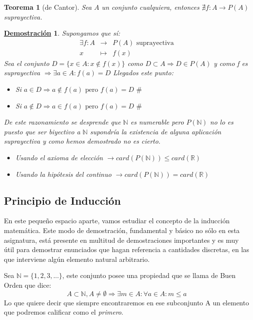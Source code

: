 \documentclass[10pt,a4paper,openright]{book}
\theoremstyle{break}
\newtheorem{theo}{Teorema}[chapter]
\newtheorem*{demo}{\underline{Demostración}}
\begin{document}
\begin{theo}[de Cantor]
Sea $A$ un conjunto cualquiera, entonces $\nexists f: A \rightarrow P(A)$  suprayectiva.
\end{theo}
\begin{demo}
Supongamos que sí:
\begin{eqnarray*}
\exists f: A &\rightarrow & P(A)\mbox{ suprayectiva} \\
x & \longmapsto & f(x)
\end{eqnarray*}
Sea el conjunto $D=\{ x\in A: x\notin f(x)\}$ como $D\subset A\Rightarrow D\in P(A)$ y como f es suprayectiva $\Rightarrow \exists a \in A : f(a)=D$
Llegados este punto:
\begin{itemize}
\item Si $a\in D\Rightarrow a\notin f(a)\mbox{ pero }f(a)=D \mbox{ \#}$
\item Si $a\notin D\Rightarrow a\in f(a)\mbox{ pero }f(a)=D \mbox{ \#}$
\end{itemize}

De este razonamiento se desprende que $\mathbb N$ es numerable pero $P(\mathbb N )$ no lo es puesto que ser biyectivo a $\mathbb N$ supondría la existencia de alguna aplicación suprayectiva y como hemos demostrado no es cierto.
\begin{itemize}
\item Usando el axioma de elección $\rightarrow card(P(\mathbb N))\leq card (\mathbb R)$
\item Usando la hipótesis del continuo $\rightarrow card(P(\mathbb N))= card (\mathbb R)$
\end{itemize}
\end{demo}

\subsection{Principio de Inducción}
En este pequeño espacio aparte, vamos estudiar el concepto de la inducción matemática. Este modo de demostración, fundamental y básico no sólo en esta asignatura, está presente en multitud de demostraciones importantes y es muy útil para demostrar enunciados que hagan referencia a cantidades discretas, en las que interviene algún elemento natural arbitrario.

Sea $\mathbb N=\{1, 2, 3,...\}$, este conjunto posee una propiedad que se llama de Buen Orden que dice:
$$A\subset \mathbb N, A\neq \emptyset \Rightarrow \exists m \in A : \forall a \in A : m\leq a$$
Lo que quiere decir que siempre encontraremos en ese subconjunto A un elemento que podremos calificar como el \textit{primero}.
\end{document}
